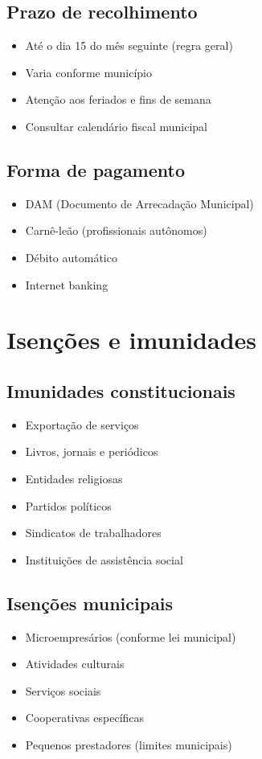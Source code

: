 \documentclass[12pt,a4paper]{article}
\begin{document}
\subsection{Prazo de recolhimento}
\begin{itemize}
    \item Até o dia 15 do mês seguinte (regra geral)
    \item Varia conforme município
    \item Atenção aos feriados e fins de semana
    \item Consultar calendário fiscal municipal
\end{itemize}

\subsection{Forma de pagamento}
\begin{itemize}
    \item DAM (Documento de Arrecadação Municipal)
    \item Carnê-leão (profissionais autônomos)
    \item Débito automático
    \item Internet banking
\end{itemize}

\section{Isenções e imunidades}

\subsection{Imunidades constitucionais}
\begin{itemize}
    \item Exportação de serviços
    \item Livros, jornais e periódicos
    \item Entidades religiosas
    \item Partidos políticos
    \item Sindicatos de trabalhadores
    \item Instituições de assistência social
\end{itemize}

\subsection{Isenções municipais}
\begin{itemize}
    \item Microempresários (conforme lei municipal)
    \item Atividades culturais
    \item Serviços sociais
    \item Cooperativas específicas
    \item Pequenos prestadores (limites municipais)
\end{itemize}
\end{document}
